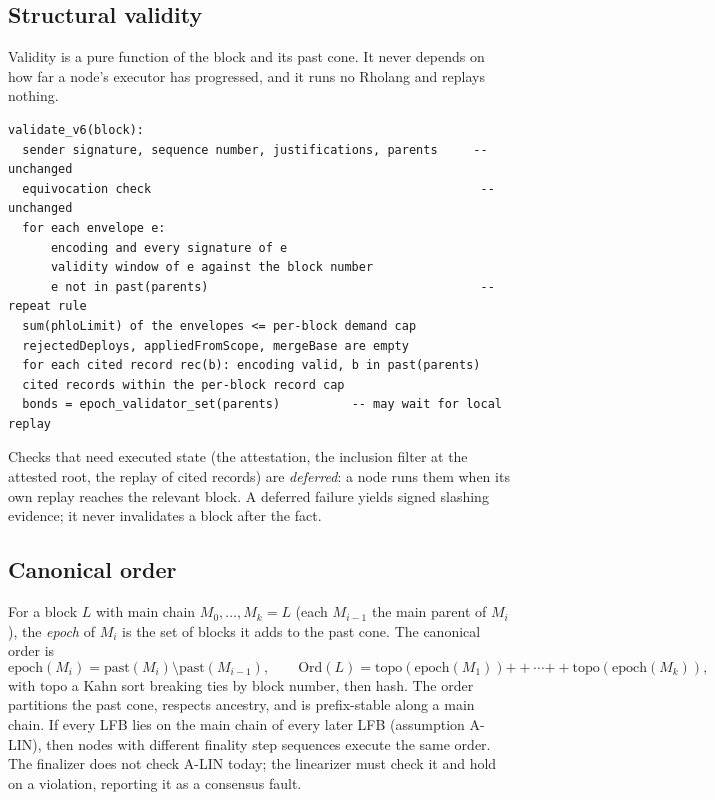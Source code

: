 \documentclass[11pt]{article}
\begin{document}
\subsection{Structural validity}

Validity is a pure function of the block and its past cone. It never depends on how far a node's executor has progressed, and it runs no Rholang and replays nothing.

\begin{Verbatim}[fontsize=\small,frame=single,framesep=6pt]
validate_v6(block):
  sender signature, sequence number, justifications, parents     -- unchanged
  equivocation check                                              -- unchanged
  for each envelope e:
      encoding and every signature of e
      validity window of e against the block number
      e not in past(parents)                                      -- repeat rule
  sum(phloLimit) of the envelopes <= per-block demand cap
  rejectedDeploys, appliedFromScope, mergeBase are empty
  for each cited record rec(b): encoding valid, b in past(parents)
  cited records within the per-block record cap
  bonds = epoch_validator_set(parents)          -- may wait for local replay
\end{Verbatim}

Checks that need executed state (the attestation, the inclusion filter at the attested root, the replay of cited records) are \emph{deferred}: a node runs them when its own replay reaches the relevant block. A deferred failure yields signed slashing evidence; it never invalidates a block after the fact.

\subsection{Canonical order}

For a block $L$ with main chain $M_0, \dots, M_k = L$ (each $M_{i-1}$ the main parent of $M_i$), the \emph{epoch} of $M_i$ is the set of blocks it adds to the past cone. The canonical order is
\[
\mathrm{epoch}(M_i) = \mathrm{past}(M_i) \setminus \mathrm{past}(M_{i-1}),
\qquad
\mathrm{Ord}(L) = \mathrm{topo}(\mathrm{epoch}(M_1)) \mathbin{+\!\!+} \cdots \mathbin{+\!\!+} \mathrm{topo}(\mathrm{epoch}(M_k)),
\]
with $\mathrm{topo}$ a Kahn sort breaking ties by block number, then hash. The order partitions the past cone, respects ancestry, and is prefix-stable along a main chain. If every LFB lies on the main chain of every later LFB (assumption A-LIN), then nodes with different finality step sequences execute the same order. The finalizer does not check A-LIN today; the linearizer must check it and hold on a violation, reporting it as a consensus fault.
\end{document}
